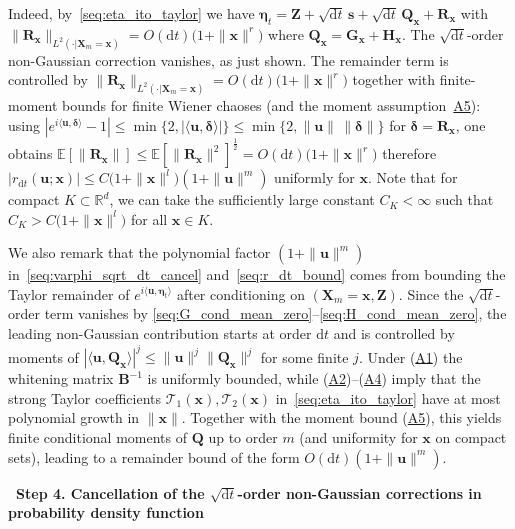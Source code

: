 Indeed, by~\eqref{seq:eta_ito_taylor} we have $\bm\eta_t=\bm Z+\sqrt{\mathrm dt}\,\bm s+\sqrt{\mathrm dt}\,\bm Q_{\bm x}+\bm R_{\bm x}$ with $\|\bm R_{\bm x}\|_{L^2(\cdot|\bm X_m=\bm x)}=O(\mathrm dt)\big(1+\|\bm x\|^r\big)$ where $\bm Q_{\bm x}=\bm G_{\bm x}+\bm H_{\bm x}$. 
The $\sqrt{\mathrm dt}$-order non-Gaussian correction vanishes, as just shown. 
The remainder term is controlled by $\|\bm R_{\bm x}\|_{L^2(\cdot|\bm X_m=\bm x)}=O(\mathrm dt)\big(1+\|\bm x\|^r\big)$ together with finite-moment bounds for finite Wiener chaoses (and the moment assumption~\hyperlink{assumption:A5}{A5}): using $|e^{i\langle\bm u,\bm \delta\rangle}-1|\leq\min\{2,|\langle\bm u,\bm\delta\rangle|\}\leq\min\{2,\|\bm u\|\,\|\bm\delta\|\}$ for $\bm\delta=\bm R_{\bm x}$, one obtains $\mathbb{E}[\|\bm R_{\bm x}\|]\leq\mathbb{E}\left[\|\bm R_{\bm x}\|^2\right]^{\frac{1}{2}}=O(\mathrm dt)\big(1+\|\bm x\|^r\big)$ 
therefore $\left|r_{\mathrm dt}(\bm u;\bm x)\right|\leq C\big(1+\|\bm x\|^l\big)(1+\|\bm u\|^m)$ uniformly for $\bm x$. Note that for compact $K\subset\mathbb R^d$, we can take the sufficiently large constant $C_K<\infty$ such that $C_K>C\big(1+\|\bm x\|^l\big)$ for all $\bm x\in K$.

We also remark that the polynomial factor $(1+\|\bm u\|^m)$ in~\eqref{seq:varphi_sqrt_dt_cancel} and~\eqref{seq:r_dt_bound} comes from bounding the Taylor remainder of
$e^{i\langle \bm u,\bm\eta_t\rangle}$ after conditioning on $(\bm X_m=\bm x,\bm Z)$.
Since the $\sqrt{\mathrm{d}t}$-order term vanishes by \eqref{seq:G_cond_mean_zero}--\eqref{seq:H_cond_mean_zero},
the leading non-Gaussian contribution starts at order $\mathrm{d}t$ and is controlled by moments of
$|\langle \bm u,\bm Q_{\bm x}\rangle|^j\le \|\bm u\|^j\|\bm Q_{\bm x}\|^j$ for some finite $j$.
Under (\hyperlink{assumption:A1}{A1}) the whitening matrix $\mathbf B^{-1}$ is uniformly bounded, while (\hyperlink{assumption:A2}{A2})--(\hyperlink{assumption:A4}{A4}) imply that the strong Taylor
coefficients $\mathcal T_1(\bm x),\mathcal T_2(\bm x)$ in~\eqref{seq:eta_ito_taylor} have at most polynomial growth in $\|\bm x\|$.
Together with the moment bound (\hyperlink{assumption:A5}{A5}), this yields finite conditional moments of $\bm Q$ up to order $m$
(and uniformity for $\bm x$ on compact sets), leading to a remainder bound of the form
$O(\mathrm dt)(1+\|\bm u\|^m)$.

\bigskip
\noindent\textbf{\textbullet\ Step 4. Cancellation of the $\sqrt{\mathrm{d}t}$-order non-Gaussian corrections in probability density function} 

